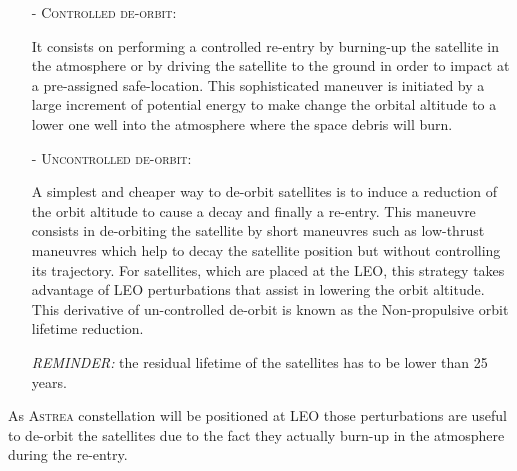 \begin{itemize}

\item[-] \textsc{Controlled de-orbit:}


It consists on performing a controlled re-entry by burning-up the satellite in the atmosphere or by driving the satellite to the ground in order to impact at a pre-assigned safe-location. 
This sophisticated maneuver is initiated by a large increment of potential energy to make change the orbital altitude to a lower one well into the atmosphere where the space debris will burn.

\item[-]  \textsc{Uncontrolled de-orbit:}

A simplest and cheaper way to de-orbit satellites is to induce a reduction of the orbit altitude to cause a decay and finally a re-entry. This maneuvre consists in de-orbiting the satellite by short maneuvres such as low-thrust maneuvres which help to decay the satellite position but without controlling its trajectory.
\newline
\newline
For satellites, which are placed at the LEO, this strategy takes advantage of LEO perturbations that assist in lowering the orbit altitude. This derivative of un-controlled de-orbit is known as the Non-propulsive orbit lifetime reduction. 
\newline

\emph{REMINDER:} the residual lifetime of the satellites has to be lower than 25 years.

\end{itemize} 

As \textsc{Astrea} constellation will be positioned at LEO those perturbations are useful to de-orbit the satellites due to the fact they actually burn-up in the atmosphere during the re-entry. 
\newline


